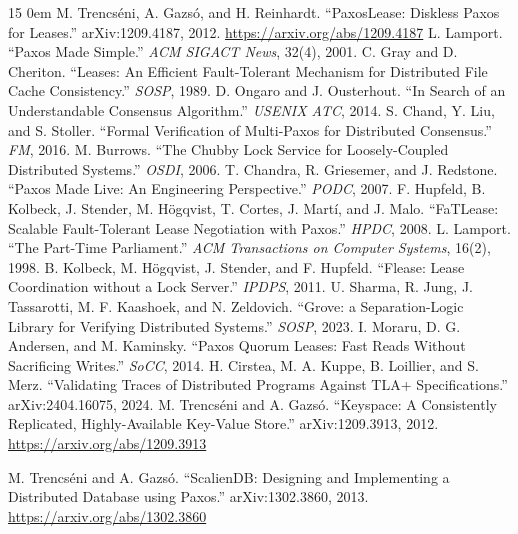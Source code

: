 \documentclass[final,5p,times,twocolumn,number]{elsarticle}
\begin{document}
\begin{thebibliography}{15}
\itemsep0em
 M. Trencs\'eni, A. Gazs\'o, and H. Reinhardt. ``PaxosLease: Diskless Paxos for Leases.'' arXiv:1209.4187, 2012. \url{https://arxiv.org/abs/1209.4187}
 L. Lamport. ``Paxos Made Simple.'' \textit{ACM SIGACT News}, 32(4), 2001.
 C. Gray and D. Cheriton. ``Leases: An Efficient Fault-Tolerant Mechanism for Distributed File Cache Consistency.'' \textit{SOSP}, 1989.
 D. Ongaro and J. Ousterhout. ``In Search of an Understandable Consensus Algorithm.'' \textit{USENIX ATC}, 2014.
 S. Chand, Y. Liu, and S. Stoller. ``Formal Verification of Multi-Paxos for Distributed Consensus.'' \textit{FM}, 2016.
 M. Burrows. ``The Chubby Lock Service for Loosely-Coupled Distributed Systems.'' \textit{OSDI}, 2006.
 T. Chandra, R. Griesemer, and J. Redstone. ``Paxos Made Live: An Engineering Perspective.'' \textit{PODC}, 2007.
 F. Hupfeld, B. Kolbeck, J. Stender, M. H\"ogqvist, T. Cortes, J. Mart\'i, and J. Malo. ``FaTLease: Scalable Fault-Tolerant Lease Negotiation with Paxos.'' \textit{HPDC}, 2008.
 L. Lamport. ``The Part-Time Parliament.'' \textit{ACM Transactions on Computer Systems}, 16(2), 1998.
 B. Kolbeck, M. H\"ogqvist, J. Stender, and F. Hupfeld. ``Flease: Lease Coordination without a Lock Server.'' \textit{IPDPS}, 2011.
 U. Sharma, R. Jung, J. Tassarotti, M. F. Kaashoek, and N. Zeldovich. ``Grove: a Separation-Logic Library for Verifying Distributed Systems.'' \textit{SOSP}, 2023.
 I. Moraru, D. G. Andersen, and M. Kaminsky. ``Paxos Quorum Leases: Fast Reads Without Sacrificing Writes.'' \textit{SoCC}, 2014.
 H. Cirstea, M. A. Kuppe, B. Loillier, and S. Merz. ``Validating Traces of Distributed Programs Against TLA+ Specifications.'' arXiv:2404.16075, 2024.
 M. Trencs\'eni and A. Gazs\'o. ``Keyspace: A Consistently Replicated, Highly-Available Key-Value Store.'' arXiv:1209.3913, 2012. \url{https://arxiv.org/abs/1209.3913}

 M. Trencs\'eni and A. Gazs\'o. ``ScalienDB: Designing and Implementing a Distributed Database using Paxos.'' arXiv:1302.3860, 2013. \url{https://arxiv.org/abs/1302.3860}
\end{thebibliography}

\flushcolsend
\clearpage
\appendix
\gdef\thetable{\arabic{table}}
\footnotesize
\end{document}

